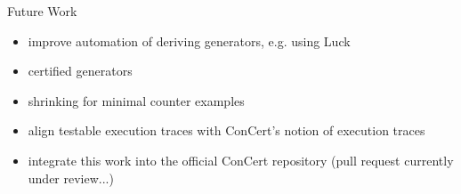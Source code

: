 \begin{frame}{Future Work}
\begin{itemize}
    \item improve automation of deriving generators, e.g. using Luck\cite{lampropoulos2016beginners}
    \item certified generators
    \item shrinking for minimal counter examples
    \item align testable execution traces with ConCert's notion of execution traces
    \item integrate this work into the official ConCert repository (pull request currently under review...)
\end{itemize}
\end{frame}
